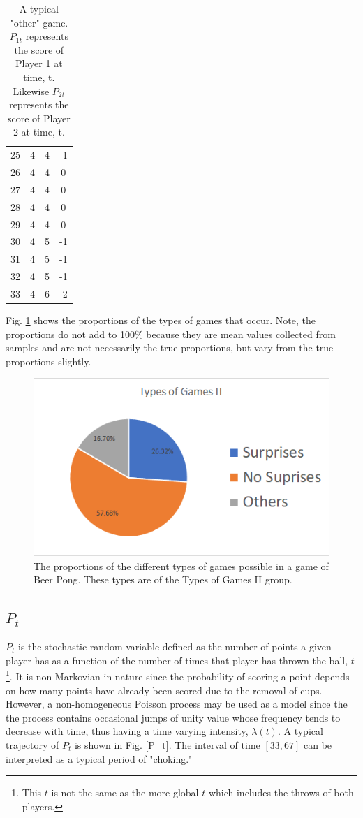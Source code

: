\documentclass{article}
\begin{document}
\begin{table}[h!]
\begin{tabular}{||c c c c||}
		25 & 4 & 4 & -1 \\
		26 & 4 & 4 & 0 \\ 
		27 & 4 & 4 & 0 \\
		28 & 4 & 4 & 0 \\
		29 & 4 & 4 & 0 \\
		30 & 4 & 5 & -1 \\
		31 & 4 & 5 & -1 \\ 
		32 & 4 & 5 & -1 \\
		33 & 4 & 6 & -2 \\ [1ex] 
		\hline
	\end{tabular}
	\caption{A typical "other" game. $P_{1t}$ represents the score of Player 1 at time, t. Likewise $P_{2t}$ represents the score of Player 2 at time, t.}
	\label{other}
\end{table}

Fig. \ref{typesofgames2} shows the proportions of the types of games that occur. Note, the proportions do not add to 100\% because they are mean values collected from samples and are not necessarily the true proportions, but vary from the true proportions slightly.

\begin{figure}
	\centering
	\includegraphics[width=0.7\linewidth]{typesofgames2}
	\caption{The proportions of the different types of games possible in a game of Beer Pong. These types are of the Types of Games II group.}
	\label{typesofgames2}
\end{figure}

\subsection{$P_t$}

$P_t$ is the stochastic random variable defined as the number of points a given player has as a function of the number of times that player has thrown the ball, $t$\footnote{This $t$ is not the same as the more global $t$ which includes the throws of both players.}. It is non-Markovian in nature since the probability of scoring a point depends on how many points have already been scored due to the removal of cups. However, a non-homogeneous Poisson process may be used as a model since the the process contains occasional jumps of unity value whose frequency tends to decrease with time, thus having a time varying intensity, $\lambda(t)$. A typical trajectory of $P_t$ is shown in Fig. \ref{P_t}. The interval of time $[33, 67]$ can be interpreted as a typical period of "choking."
\end{document}
